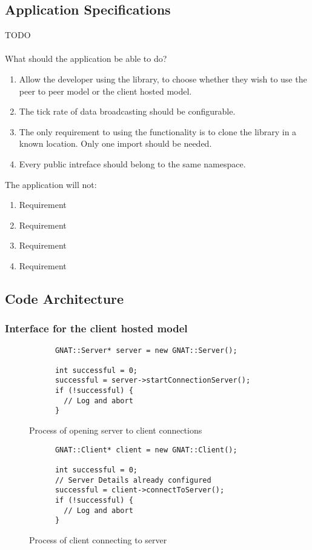 \subsection{Application Specifications}
TODO
\\
\\
What should the application be able to do?
\begin{enumerate}
\item Allow the developer using the library, to choose whether they wish to use the peer to peer model or the client hosted model.
\item The tick rate of data broadcasting should be configurable.
\item The only requirement to using the functionality is to clone the library in a known location. Only one import should be needed.
\item Every public intreface should belong to the same namespace.
\end{enumerate}
The application will not:
\begin{enumerate}
\item Requirement
\item Requirement
\item Requirement
\item Requirement
\end{enumerate}


\subsection{Code Architecture}


\subsubsection{Interface for the client hosted model}

\begin{figure}[!h]
  \centering
  \begin{lstlisting}
      GNAT::Server* server = new GNAT::Server();

      int successful = 0;
      successful = server->startConnectionServer();
      if (!successful) {
        // Log and abort
      }
  \end{lstlisting}
  \caption{Process of opening server to client connections}
  \label{code:server_conn}
\end{figure}

\begin{figure}[!h]
  \centering
  \begin{lstlisting}
      GNAT::Client* client = new GNAT::Client();

      int successful = 0;
      // Server Details already configured
      successful = client->connectToServer();
      if (!successful) {
        // Log and abort
      }
  \end{lstlisting}
  \caption{Process of client connecting to server}
  \label{code:client_conn}
\end{figure}

